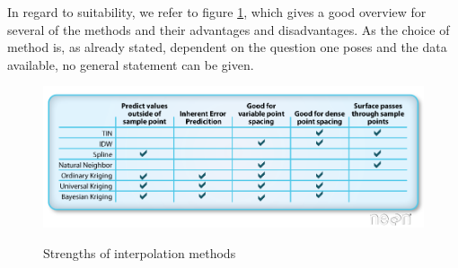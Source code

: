 In regard to suitability, we refer to figure \ref{fig:interpolation_methods_strengths}, which gives a good overview for several of the methods and their advantages and disadvantages. As the choice of method is, as already stated, dependent on the question one poses and the data available, no general statement can be given. 


\begin{figure}
	\includegraphics[width=\linewidth]{images/interpolation_methods_strengths.png}
	\label{fig:interpolation_methods_strengths}
	\caption{Strengths of interpolation methods \cite{wasser_going_2020}}
\end{figure}

